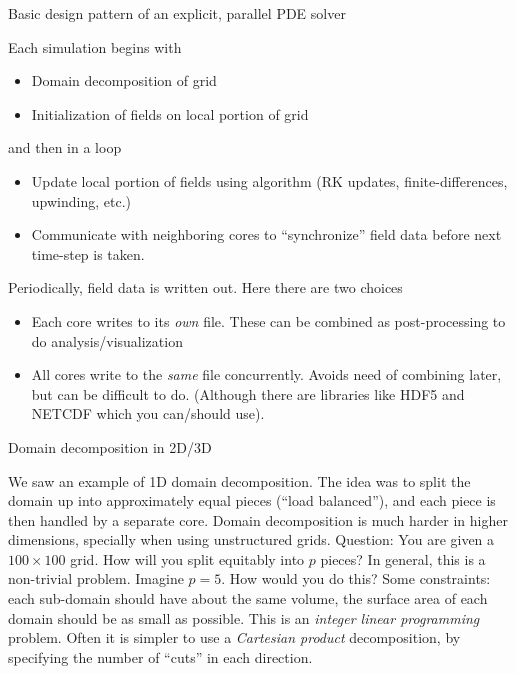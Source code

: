 \documentclass[aspectratio=169]{beamer}
\newcommand{\mypause}{\pause}
\begin{document}
\begin{frame}{Basic design pattern of an explicit, parallel PDE
    solver}

  Each simulation begins with
  \begin{itemize}
  \item Domain decomposition of grid
  \item Initialization of fields on local portion of grid
  \end{itemize}
  \mypause%
  and then in a loop
  \begin{itemize}
  \item Update local portion of fields using algorithm (RK updates,
    finite-differences, upwinding, etc.)
  \item Communicate with neighboring cores to ``synchronize'' field data
    before next time-step is taken.
  \end{itemize}
  \mypause%
  Periodically, field data is written out. Here there are two choices
  \begin{itemize}
  \item Each core writes to its \emph{own} file. These can be combined
    as post-processing to do analysis/visualization
  \item All cores write to the \emph{same} file concurrently. Avoids
    need of combining later, but can be difficult to do. (Although
    there are libraries like HDF5 and NETCDF which you can/should
    use).
  \end{itemize}

\end{frame}

\begin{frame}{Domain decomposition in 2D/3D}

  We saw an example of 1D domain decomposition. The idea was to split
  the domain up into approximately equal pieces (``load balanced''),
  and each piece is then handled by a separate core.%
  \vskip0.1in%
  Domain decomposition is much harder in higher dimensions, specially
  when using unstructured grids.%
  \vskip0.1in%
  {\color{blue} Question: You are given a $100\times 100$ grid. How
    will you split equitably into $p$ pieces?}%
  \mypause%
  \vskip0.1in%
  In general, this is a non-trivial problem. Imagine $p=5$. How would
  you do this? Some constraints: each sub-domain should have about the
  same volume, the surface area of each domain should be as small as
  possible. This is an \emph{integer linear programming} problem.%
  \vskip0.1in%
  Often it is simpler to use a \emph{Cartesian product} decomposition,
  by specifying the number of ``cuts'' in each direction.
\end{frame}
\end{document}
